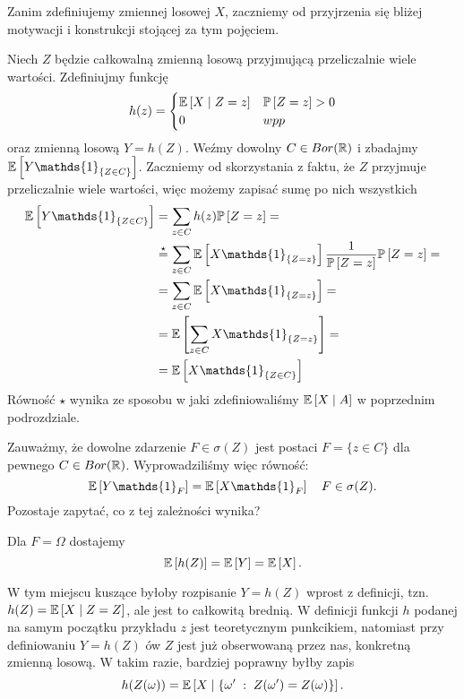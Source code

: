 Zanim zdefiniujemy  zmiennej losowej $X$, zaczniemy od przyjrzenia się bliżej motywacji i konstrukcji stojącej za tym pojęciem.

Niech $Z$ będzie całkowalną zmienną losową przyjmującą przeliczalnie wiele wartości. Zdefiniujmy funkcję
    $$h(z)=\begin{cases}\expected{X\;|\; Z=z}&\prob{Z=z}>0\\0&wpp\end{cases}$$
    oraz zmienną losową $Y=h(Z)$. Weźmy dowolny $C\in Bor(\operatorname{\mathbb{R}})$ i zbadajmy $\expected{Y\mathds{1}_{\{Z\in C\}}}$. Zaczniemy od skorzystania z faktu, że $Z$ przyjmuje przeliczalnie wiele wartości, więc możemy zapisać sumę po nich wszystkich
    \begin{align*}
      \expected{Y\mathds{1}_{\{Z\in C\}}}&=\sum_{z\in C}h(z)\prob{Z=z}=\\
                                         &\overset{\star}{=}\sum_{z\in C}\expected{X\mathds{1}_{\{Z=z\}}}\frac{1}{\prob{Z=z}}\prob{Z=z}=\\
                                         &=\sum_{z\in C}\expected{X\mathds{1}_{\{Z=z\}}}=\\
                                         &=\expected{\sum_{z\in C}X\mathds{1}_{\{Z=z\}}}=\\
                                         &=\expected{X\mathds{1}_{\{Z\in C\}}}
    \end{align*}
    Równość $\star$ wynika ze sposobu w jaki zdefiniowaliśmy $\expected{X}{A}$ w poprzednim podrozdziale.

    Zauważmy, że dowolne zdarzenie $F\in\sigma(Z)$ jest postaci $F=\{z\in C\}$ dla pewnego $C\in Bor(\operatorname{\mathbb{R}})$. Wyprowadziliśmy więc równość:
    $$\expected{Y\mathds{1}_F}=\expected{X\mathds{1}_F}\quad F\in\sigma(Z).$$
    Pozostaje zapytać, co z tej zależności wynika?

    Dla $F=\Omega$ dostajemy
    $$\expected{h(Z)}=\expected{Y}=\expected{X}.$$

    \begin{dygresja}
      W tym miejscu kuszące byłoby rozpisanie $Y=h(Z)$ wprost z definicji, tzn. $h(Z)=\expected{X}{Z=Z}$, ale jest to całkowitą brednią. W definicji funkcji $h$ podanej na samym początku przykładu $z$ jest teoretycznym punkcikiem, natomiast przy definiowaniu $Y=h(Z)$ ów $Z$ jest już obserwowaną przez nas, konkretną zmienną losową. W takim razie, bardziej poprawny byłby zapis
    $$h(Z(\omega))=\expected{X}{\{\omega'\;:\;Z(\omega')=Z(\omega)\}}.$$
    \end{dygresja}

